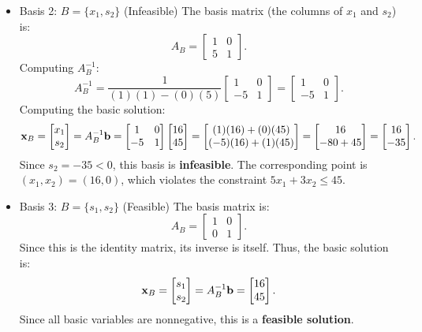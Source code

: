 \begin{itemize}
\item  Basis 2: \(B= \{x_1, s_2\} \) (Infeasible)
The basis matrix (the columns of \( x_1 \) and \( s_2 \)) is:
\[
A_B =
\begin{bmatrix}
    1 & 0 \\
    5 & 1
\end{bmatrix}.
\]
Computing \( A_B^{-1} \):
\[
A_B^{-1} =
\frac{1}{(1)(1) - (0)(5)}
\begin{bmatrix}
    1 & 0 \\
    -5 & 1
\end{bmatrix}
=
\begin{bmatrix}
    1 & 0 \\
    -5 & 1
\end{bmatrix}.
\]
Computing the basic solution:
\[
\mathbf{x}_B = \begin{bmatrix} x_1 \\ s_2 \end{bmatrix} = A_B^{-1}\mathbf{b}=
\begin{bmatrix}
    1 & 0 \\
    -5 & 1
\end{bmatrix}
\begin{bmatrix}
    16 \\ 45
\end{bmatrix}
=
\begin{bmatrix}
    (1)(16) + (0)(45) \\
    (-5)(16) + (1)(45)
\end{bmatrix}
=
\begin{bmatrix}
    16 \\
    -80 + 45
\end{bmatrix}
=
\begin{bmatrix}
    16 \\ -35
\end{bmatrix}.
\]
Since \( s_2 = -35 < 0 \), this basis is \textbf{infeasible}.  The corresponding point is \( (x_1, x_2) = (16, 0) \), which violates the constraint \( 5x_1 + 3x_2 \leq 45 \).

\item  Basis 3: \(B= \{s_1, s_2\} \) (Feasible)
The basis matrix is:
\[
A_B =
\begin{bmatrix}
    1 & 0 \\
    0 & 1
\end{bmatrix}.
\]
Since this is the identity matrix, its inverse is itself. Thus, the basic solution is:
\[
\mathbf{x}_B = \begin{bmatrix} s_1 \\ s_2 \end{bmatrix} = A_B^{-1}\mathbf{b}=
\begin{bmatrix}
    16 \\ 45
\end{bmatrix}.
\]
Since all basic variables are nonnegative, this is a \textbf{feasible solution}.
\end{itemize}


